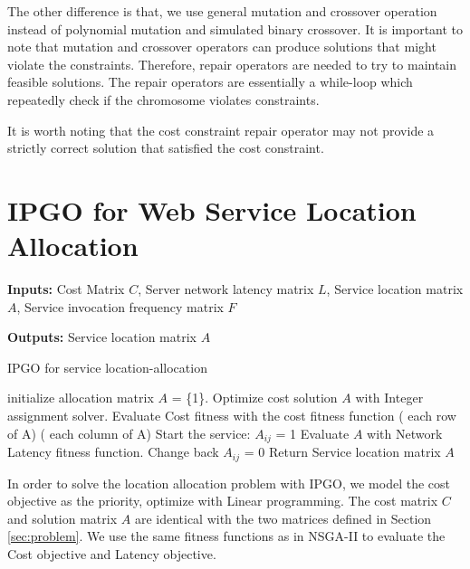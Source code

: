 \documentclass{llncs}
\begin{document}
The other difference is that, we use general mutation and crossover operation instead of polynomial mutation and simulated binary crossover.
It is important to note that mutation and crossover operators can produce solutions that might violate the constraints. 
Therefore, repair operators are needed to try to maintain feasible solutions. The repair operators are essentially a while-loop 
which repeatedly check if the chromosome violates constraints.

It is worth noting that the cost constraint repair operator may not provide a strictly correct solution that satisfied the cost constraint.

\section{IPGO for Web Service Location Allocation}
\begin{algorithm}[htb]
	\textbf{Inputs:}
		Cost Matrix $C$,
		Server network latency matrix $L$, 
		Service location matrix $A$, 
		Service invocation frequency matrix $F$

	\textbf{Outputs:}
		Service location matrix $A$
	\caption{IPGO for service location-allocation}
	\label{IPGO}
	\begin{algorithmic}[1]
		\State initialize allocation matrix $A$ = \{1\}.
		\State Optimize cost solution $A$ with Integer assignment solver.
		\State Evaluate Cost fitness with the cost fitness function
		\For( each row of A)
			\For( each column of A)
					\State Start the service: $A_{ij}$ = 1
					\State Evaluate $A$ with Network Latency fitness function.
						\State Change back $A_{ij}$ = 0
					\EndIf
				\EndIf
			\EndFor
		\EndFor
		\State Return Service location matrix $A$
	\end{algorithmic}
\end{algorithm}
In order to solve the location allocation problem with IPGO, we model the cost objective as the priority, optimize with Linear programming.
The cost matrix $C$ and solution matrix $A$ are identical with the two matrices defined in Section \ref{sec:problem}. We use the same fitness functions as in NSGA-II to 
evaluate the Cost objective and Latency objective.

\end{document}
